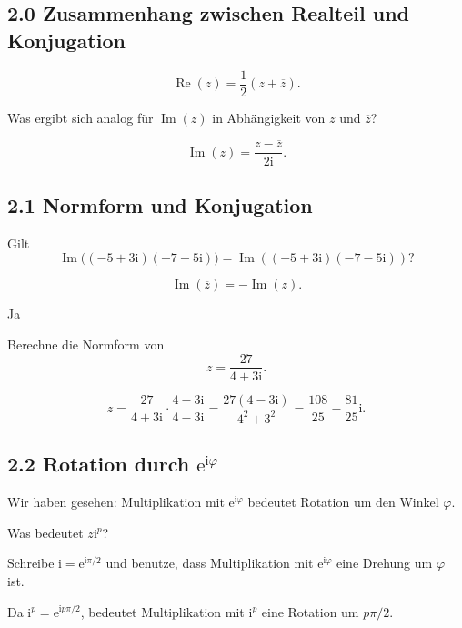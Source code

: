 \documentclass[11pt,a4paper]{article}
\newcommand{\ii}{\mathrm i}
\newcommand{\ee}{\mathrm e}
\newcommand{\Ree}{\operatorname{Re}}
\newcommand{\Imm}{\operatorname{Im}}
\begin{document}
\subsection{2.0 Zusammenhang zwischen Realteil und Konjugation}
\begin{importantbox}
\[
\Ree(z)=\frac12(z+\overline z).
\]
\end{importantbox}

\begin{fragebox}
Was ergibt sich analog für $\Imm(z)$ in Abhängigkeit von $z$ und $\overline z$?
\end{fragebox}
\begin{antwortbox}
\[
\Imm(z)=\frac{z-\overline z}{2\ii}.
\]
\end{antwortbox}

\subsection{2.1 Normform und Konjugation}
\begin{fragebox}
Gilt
\[
 \Imm\bigl((-5+3\ii)(-7-5\ii)\bigr)=\Imm((-5+3\ii)(-7-5\ii))?
\]
\end{fragebox}
\begin{tippbox}
\[
\Imm(\overline z)=-\Imm(z).
\]
\end{tippbox}
\begin{antwortbox}
Ja
\end{antwortbox}

\begin{fragebox}
Berechne die Normform von
\[
z=\frac{27}{4+3\ii}.
\]
\end{fragebox}
\begin{antwortbox}
\[
 z=\frac{27}{4+3\ii}\cdot\frac{4-3\ii}{4-3\ii}
 =\frac{27(4-3\ii)}{4^2+3^2}
 =\frac{108}{25}-\frac{81}{25}\ii.
\]
\end{antwortbox}

\subsection{2.2 Rotation durch $\ee^{\ii\varphi}$}
Wir haben gesehen: Multiplikation mit $\ee^{\ii\varphi}$ bedeutet Rotation um den Winkel $\varphi$.

\begin{fragebox}
Was bedeutet $z\ii^p$?
\end{fragebox}
\begin{tippbox}
Schreibe $\ii=\ee^{\ii\pi/2}$ und benutze, dass Multiplikation mit $\ee^{\ii\varphi}$ eine Drehung um $\varphi$ ist.
\end{tippbox}
\begin{antwortbox}
Da $\ii^p=\ee^{\ii p\pi/2}$, bedeutet Multiplikation mit $\ii^p$ eine Rotation um $p\pi/2$.
\end{antwortbox}
\end{document}
